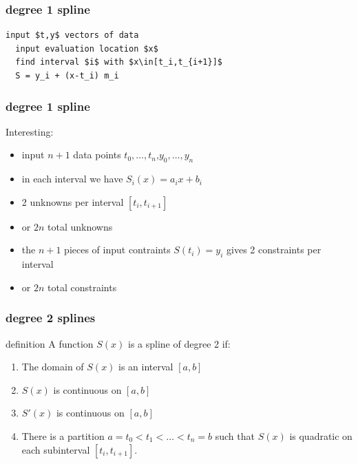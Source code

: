 \documentclass[10pt]{beamer}
\begin{document}
\begin{frame}[fragile]
\frametitle{degree 1 spline}
\begin{lstlisting}[mathescape]
  input $t,y$ vectors of data
  input evaluation location $x$
  find interval $i$ with $x\in[t_i,t_{i+1}]$
  S = y_i + (x-t_i) m_i
\end{lstlisting}
\end{frame}
\begin{frame}
\frametitle{degree 1 spline}
Interesting:
\begin{itemize}
  \item input $n+1$ data points $t_0,\dots,t_n$,$y_0,\dots,y_n$
  \item in each interval we have $S_i(x) = a_i x + b_i$
  \item 2 unknowns per interval $[t_i,t_{i+1}]$
  \item or $2n$ total unknowns
  \item the $n+1$ pieces of input contraints $S(t_i)=y_i$ gives 2
constraints per interval
  \item or $2n$ total constraints 
\end{itemize}
\end{frame}
\begin{frame}
\frametitle{degree 2 splines}
\begin{block}{definition}
A function $S(x)$ is a spline of degree 2 if:
\begin{enumerate}
  \item The domain of $S(x)$ is an interval $[a,b]$
  \item $S(x)$ is continuous on $[a,b]$
  \item $S'(x)$ is continuous on $[a,b]$
  \item There is a partition $a=t_0<t_1<\dots<t_n=b$ such that $S(x)$ is
quadratic on each subinterval $[t_i,t_{i+1}]$.
\end{enumerate}
\end{block}
\end{frame}
\end{document}
